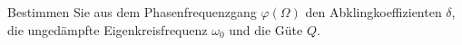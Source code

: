 \begin{ExerciseBlock}
Bestimmen Sie aus dem Phasenfrequenzgang $\varphi(\Omega)$ den Abklingkoeffizienten $\delta$, die ungedämpfte Eigenkreisfrequenz $\omega_0$ und die Güte $Q$.
\begin{center}
\end{center}
\end{ExerciseBlock}
